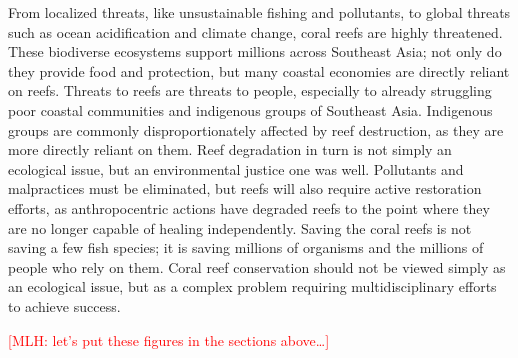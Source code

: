 \documentclass{book}\usepackage{knitr}
\newcommand{\red}[1]{\textcolor{red}{[MLH: #1]}}
\begin{document}
\begin{knitrout}
\begin{kframe}
{From localized threats, like unsustainable fishing and pollutants, to global threats such as ocean acidification and climate change, coral reefs are highly threatened. These biodiverse ecosystems support millions across Southeast Asia; not only do they provide food and protection, but many coastal economies are directly reliant on reefs. Threats to reefs are threats to people, especially to already struggling poor coastal communities and indigenous groups of Southeast Asia. Indigenous groups are commonly disproportionately affected by reef destruction, as they are more directly reliant on them. Reef degradation in turn is not simply an ecological issue, but an environmental justice one was well. Pollutants and malpractices must be eliminated, but reefs will also require active restoration efforts, as anthropocentric actions have degraded reefs to the point where they are no longer capable of healing independently. Saving the coral reefs is not saving a few fish species; it is saving millions of organisms and the millions of people who rely on them. Coral reef conservation should not be viewed simply as an ecological issue, but as a complex problem requiring multidisciplinary efforts to achieve success.

\red{let's put these figures in the sections above\ldots}


}
\end{kframe}
\end{knitrout}
\end{document}
